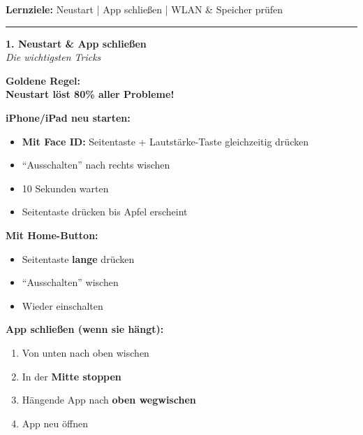 \documentclass[a4paper,landscape,8pt]{extarticle}
\begin{document}

 \hfill
{\footnotesize\textbf{Lernziele:} Neustart | App schließen | WLAN \& Speicher prüfen}

\vspace{1mm}
\hrule
\vspace{1mm}

\begin{minipage}[t]{0.32\linewidth}
\begin{center}
\colorbox{restartblue!15}{%
\begin{minipage}{0.95\linewidth}
\vspace{2mm}
\begin{center}
{\Large\bfseries\textcolor{restartblue}{1. Neustart \& App schließen}}\\[1pt]
{\footnotesize\itshape Die wichtigsten Tricks}
\end{center}
\vspace{2mm}
\end{minipage}%
}
\end{center}

\vspace{1mm}

\textbf{Goldene Regel:}\\
\textbf{Neustart löst 80\% aller Probleme!}

\textbf{iPhone/iPad neu starten:}
\begin{itemize}
\item \textbf{Mit Face ID:} Seitentaste + Lautstärke-Taste gleichzeitig drücken
\item ``Ausschalten'' nach rechts wischen
\item 10 Sekunden warten
\item Seitentaste drücken bis Apfel erscheint
\end{itemize}

\textbf{Mit Home-Button:}
\begin{itemize}
\item Seitentaste \textbf{lange} drücken
\item ``Ausschalten'' wischen
\item Wieder einschalten
\end{itemize}

\textbf{App schließen (wenn sie hängt):}
\begin{enumerate}
\item Von unten nach oben wischen
\item In der \textbf{Mitte stoppen}
\item Hängende App nach \textbf{oben wegwischen}
\item App neu öffnen
\end{enumerate}

\end{minipage}%
\end{document}

